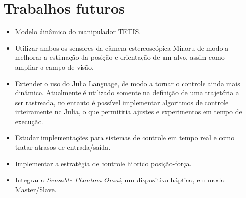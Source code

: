 \section{Trabalhos futuros}
\begin{itemize}
\item Modelo dinâmico do manipulador TETIS.

\item Utilizar ambos os sensores da cãmera estereoscópica Minoru de modo a melhorar a estimação da posição e orientação de um alvo, assim como ampliar o campo de visão.

\item Extender o uso do Julia Language, de modo a tornar o controle ainda mais dinâmico. Atualmente é utilizado somente na definição de uma trajetória a ser rastreada, no entanto é possível implementar algoritmos de controle inteiramente no Julia, o que permitiria ajustes e experimentos em tempo de execução.

\item Estudar implementações para sistemas de controle em tempo real e como tratar atrasos de entrada/saída.

\item Implementar a estratégia de controle híbrido posição-força.

\item Integrar o \textit{Sensable Phantom Omni}, um dispositivo háptico, em modo Master/Slave.
\end{itemize}

